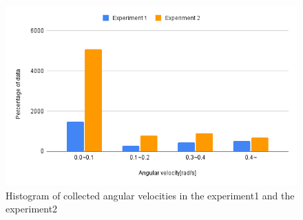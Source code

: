 

\newpage
\begin{figure}[h]
  \centering
  \includegraphics[keepaspectratio, scale=0.6]{images/ang_sum.png}
  \caption{Histogram of collected angular velocities in the experiment1 and the experiment2}
  \label{Fig:hist}
  \end{figure}


